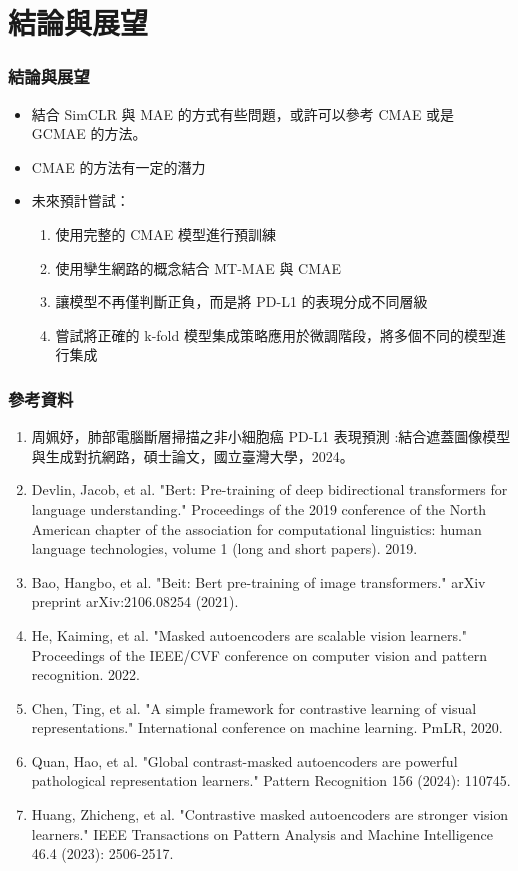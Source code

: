 \documentclass[xcolor=dvipsnames]{beamer}
\begin{document}
    \section{結論與展望}
    \begin{frame}
        \sectionpage
    \end{frame}
    \begin{frame}
        \frametitle{結論與展望}
        \begin{itemize}
            \item 結合 SimCLR 與 MAE 的方式有些問題，或許可以參考 CMAE 或是 GCMAE 的方法。
            \item CMAE 的方法有一定的潛力
            \item 未來預計嘗試：
            \begin{enumerate}
                \item 使用完整的 CMAE 模型進行預訓練
                \item 使用孿生網路的概念結合 MT-MAE 與 CMAE
                \item 讓模型不再僅判斷正負，而是將 PD-L1 的表現分成不同層級
                \item 嘗試將正確的 k-fold 模型集成策略應用於微調階段，將多個不同的模型進行集成
            \end{enumerate}
        \end{itemize}
    \end{frame}

    \begin{frame}
        \frametitle{參考資料}
            \begin{enumerate}
                \footnotesize
                \item 周姵妤，肺部電腦斷層掃描之非小細胞癌 PD-L1 表現預測 :結合遮蓋圖像模型與生成對抗網路，碩士論文，國立臺灣大學，2024。
                \item Devlin, Jacob, et al. "Bert: Pre-training of deep bidirectional transformers for language understanding." Proceedings of the 2019 conference of the North American chapter of the association for computational linguistics: human language technologies, volume 1 (long and short papers). 2019.
                \item Bao, Hangbo, et al. "Beit: Bert pre-training of image transformers." arXiv preprint arXiv:2106.08254 (2021).
                \item He, Kaiming, et al. "Masked autoencoders are scalable vision learners." Proceedings of the IEEE/CVF conference on computer vision and pattern recognition. 2022.
                \item Chen, Ting, et al. "A simple framework for contrastive learning of visual representations." International conference on machine learning. PmLR, 2020.
                \item Quan, Hao, et al. "Global contrast-masked autoencoders are powerful pathological representation learners." Pattern Recognition 156 (2024): 110745.
                \item Huang, Zhicheng, et al. "Contrastive masked autoencoders are stronger vision learners." IEEE Transactions on Pattern Analysis and Machine Intelligence 46.4 (2023): 2506-2517.
            \end{enumerate}
    \end{frame}
\end{document}
